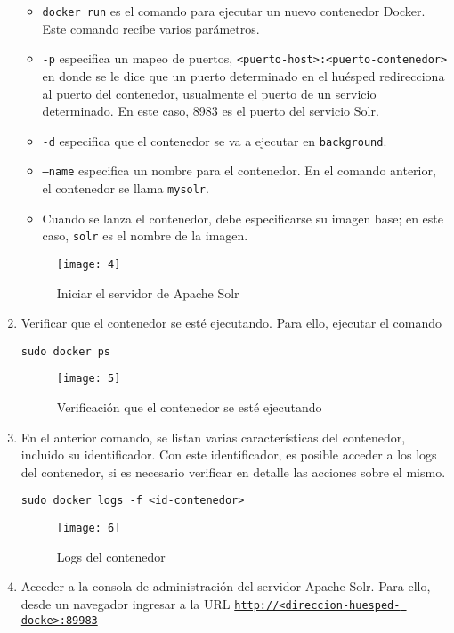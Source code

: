 \documentclass[10pt]{article}   			%
\begin{document}
\begin{enumerate}
	\begin{itemize}
		\item \texttt{docker run} es el comando para ejecutar un nuevo contenedor Docker.\\
		 Este comando recibe varios parámetros.
		 \item \texttt{-p} especifica un mapeo de puertos, \texttt{<puerto-host>:<puerto-contenedor>} en donde se le dice que un puerto determinado en el huésped redirecciona al puerto del contenedor, usualmente el puerto de un servicio determinado. En este caso, 8983 es el puerto del servicio Solr.
		 \item \texttt{-d} especifica que el contenedor se va a ejecutar en \texttt{background}.
		 \item \texttt{--name} especifica un nombre para el contenedor. En el comando anterior, el contenedor se llama \texttt{mysolr}.
		 \item Cuando se lanza el contenedor, debe especificarse su imagen base; en este caso, \texttt{solr} es el nombre de la imagen.
	\end{itemize}
	
\begin{figure}[ht]
	\centering
	\texttt{[image: 4]}   
	\caption{Iniciar el servidor de Apache Solr} 
\end{figure}	
	
\newpage
	\item Verificar que el contenedor se esté ejecutando. Para ello, ejecutar el comando
		\begin{center}
			\texttt{sudo docker ps}
		\end{center}
\begin{figure}[ht]
	\centering
	\texttt{[image: 5]}   
	\caption{ Verificación que el contenedor se esté ejecutando} 
\end{figure}		
		
		
		\item En el anterior comando, se listan varias características del contenedor, incluido su identificador. Con este identificador, es posible acceder a los logs del contenedor, si es necesario verificar en detalle las acciones sobre el mismo.
		\begin{center}
			\texttt{sudo docker logs -f <id-contenedor>}
		\end{center}
\begin{figure}[ht]
	\centering
	\texttt{[image: 6]}   
	\caption{Logs del contenedor} 
\end{figure}	
\newpage		
		\item Acceder a la consola de administración del servidor Apache Solr. Para ello, desde un navegador ingresar a la URL  \href{http://127.0.0.1:89983}{\texttt{http://<direccion-huesped- docke>:89983}}
		

\end{enumerate}
\end{document}
